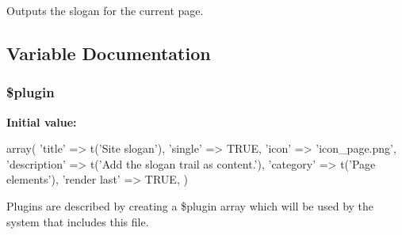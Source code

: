 Outputs the slogan for the current page. 

\subsection{Variable Documentation}
\hypertarget{page__slogan_8inc_ada8a7130088351710bb02ed622d6bf65}{
\subsubsection[{\$plugin}]{\setlength{\rightskip}{0pt plus 5cm}\$plugin}}
\label{page__slogan_8inc_ada8a7130088351710bb02ed622d6bf65}
{\bfseries Initial value:}
\begin{DoxyCode}
 array(
  'title' => t('Site slogan'),
  'single' => TRUE,
  'icon' => 'icon_page.png',
  'description' => t('Add the slogan trail as content.'),
  'category' => t('Page elements'),
  'render last' => TRUE,
)
\end{DoxyCode}
Plugins are described by creating a \$plugin array which will be used by the system that includes this file. 